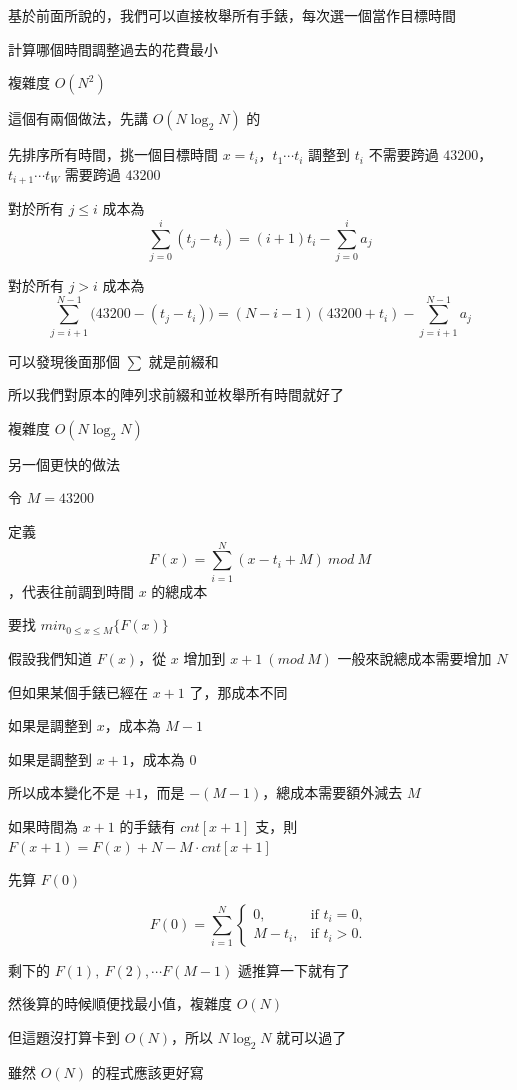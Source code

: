 \begin{frame}{}
    基於前面所說的，我們可以直接枚舉所有手錶，每次選一個當作目標時間

    計算哪個時間調整過去的花費最小

    複雜度 $O(N^2)$
\end{frame}

\begin{frame}{}
    這個有兩個做法，先講 $O(N \log_2 N)$ 的

    先排序所有時間，挑一個目標時間 $x = t_i$，$t_1 \cdots t_i$ 調整到 $t_i$ 不需要跨過 $43200$，$t_{i+1} \cdots t_W$ 需要跨過 $43200$

    對於所有 $j \le i$ 成本為
\[
\displaystyle \sum_{j=0}^{i}(t_j-t_i)
= (i+1)t_i-\displaystyle\sum_{j=0}^{i}a_j
\]

對於所有 $j>i$ 成本為
\[
\displaystyle \sum_{j=i+1}^{N-1}\bigl(43200-(t_j-t_i)\bigr)
= (N-i-1)(43200+t_i)-\displaystyle\sum_{j=i+1}^{N-1}a_j
\]
\end{frame}

\begin{frame}{}
    可以發現後面那個 $\sum$ 就是前綴和

    所以我們對原本的陣列求前綴和並枚舉所有時間就好了

    複雜度 $O(N \log_2 N)$
\end{frame}

\begin{frame}{}
    另一個更快的做法

    令 $M=43200$

    定義
\[
F(x) = \displaystyle \sum_{i=1}^{N}{(x - t_i + M)}\ mod\ M
\]
，代表往前調到時間 $x$ 的總成本

    要找 $min_{0 \le x \le M}{\{F(x)\}}$

    假設我們知道 $F(x)$，從 $x$ 增加到 $x + 1\ (mod\ M)$ 一般來說總成本需要增加 $N$

    但如果某個手錶已經在 $x+1$ 了，那成本不同

    如果是調整到 $x$，成本為 $M-1$

    如果是調整到 $x+1$，成本為 $0$
\end{frame}

\begin{frame}{}
    所以成本變化不是 $+1$，而是 $-(M-1)$，總成本需要額外減去 $M$

    如果時間為 $x + 1$ 的手錶有 $cnt[x + 1]$ 支，則 $F(x + 1) = F(x) + N - M \cdot cnt[x + 1]$

    先算 $F(0)$

\[
F(0)=\sum_{i=1}^{N}
\begin{cases}
0, & \text{if } t_i=0,\\
M-t_i, & \text{if } t_i>0.
\end{cases}
\]

    剩下的 $F(1),\ F(2), \cdots F(M-1)$ 遞推算一下就有了

    然後算的時候順便找最小值，複雜度 $O(N)$
\end{frame}

\begin{frame}{}
    但這題沒打算卡到 $O(N)$，所以 $N \log_2 N$ 就可以過了

    雖然 $O(N)$ 的程式應該更好寫
\end{frame}
